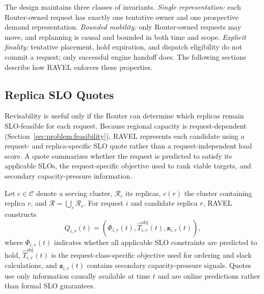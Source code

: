 The design maintains three classes of invariants.
\emph{Single representation:} each Router-owned request has exactly one
tentative owner and one prospective demand representation.
\emph{Bounded mobility:} only Router-owned requests may move, and replanning is
causal and bounded in both time and scope.
\emph{Explicit finality:} tentative placement, hold expiration, and dispatch
eligibility do not commit a request; only successful engine handoff does.
The following sections describe how RAVEL enforces these properties.


\subsection{Replica SLO Quotes}
\label{sec:design:feasibility}

Revisability is useful only if the Router can determine which replicas remain
SLO-feasible for each request.
Because regional capacity is request-dependent
(Section~\ref{sec:problem:feasibility}), RAVEL represents each candidate using
a request- and replica-specific SLO quote rather than a request-independent
load score.
A quote summarizes whether the request is predicted to satisfy its applicable
SLOs, the request-specific objective used to rank viable targets, and
secondary capacity-pressure information.

Let $c\in\mathcal{C}$ denote a serving cluster,
$\mathcal{R}_c$ its replicas, $c(r)$ the cluster containing replica $r$, and
$\mathcal{R}=\bigcup_c\mathcal{R}_c$.
For request $i$ and candidate replica $r$, RAVEL constructs
\begin{equation}
    Q_{i,r}(t)
    =
    \left(
        \Phi_{i,r}(t),
        \widehat{T}^{\mathrm{obj}}_{i,r}(t),
        \mathbf{z}_{i,r}(t)
    \right),
    \label{eq:ravel-quote}
\end{equation}
where $\Phi_{i,r}(t)$ indicates whether all applicable SLO constraints are
predicted to hold,
$\widehat{T}^{\mathrm{obj}}_{i,r}(t)$ is the request-class-specific objective
used for ordering and slack calculations, and
$\mathbf{z}_{i,r}(t)$ contains secondary capacity-pressure signals.
Quotes use only information causally available at time $t$ and are online
predictions rather than formal SLO guarantees.

